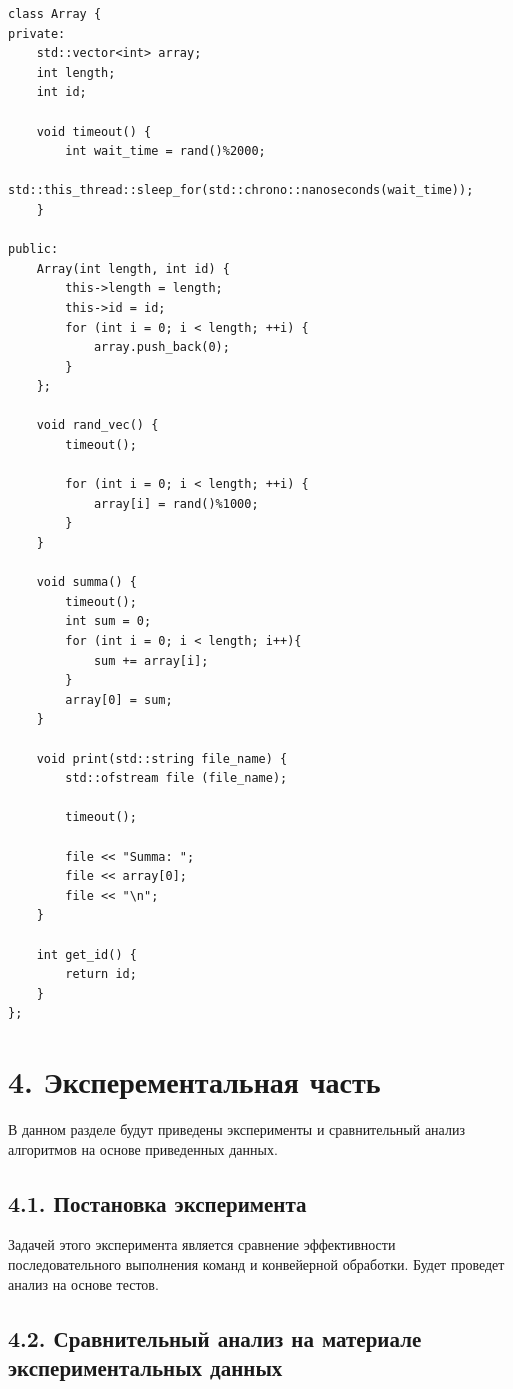 \documentclass[a4paper,12pt]{article}
\begin{document}
\begin{lstlisting}[label=some-code,caption=Класс Array]
class Array {
private:
    std::vector<int> array;
    int length;
    int id;

    void timeout() {
        int wait_time = rand()%2000;
        std::this_thread::sleep_for(std::chrono::nanoseconds(wait_time));
    }

public:
    Array(int length, int id) {
        this->length = length;
        this->id = id;
        for (int i = 0; i < length; ++i) {
            array.push_back(0);
        }
    };

    void rand_vec() {
        timeout();

        for (int i = 0; i < length; ++i) {
            array[i] = rand()%1000;
        }
    }

    void summa() {
        timeout();
        int sum = 0;
        for (int i = 0; i < length; i++){
            sum += array[i];
        }
        array[0] = sum;
    }

    void print(std::string file_name) {
        std::ofstream file (file_name);

        timeout();

        file << "Summa: ";
        file << array[0];
        file << "\n";
    }
    
    int get_id() {
        return id;
    }
};
\end{lstlisting}


\newpage
\section*{4. Эксперементальная часть}

В данном разделе будут приведены эксперименты и сравнительный анализ алгоритмов на основе приведенных данных.

\subsection*{4.1. Постановка эксперимента}

Задачей этого эксперимента является сравнение эффективности последовательного выполнения команд и конвейерной обработки. Будет проведет анализ на основе тестов.

\subsection*{4.2. Сравнительный анализ на материале экспериментальных данных}
\end{document}
